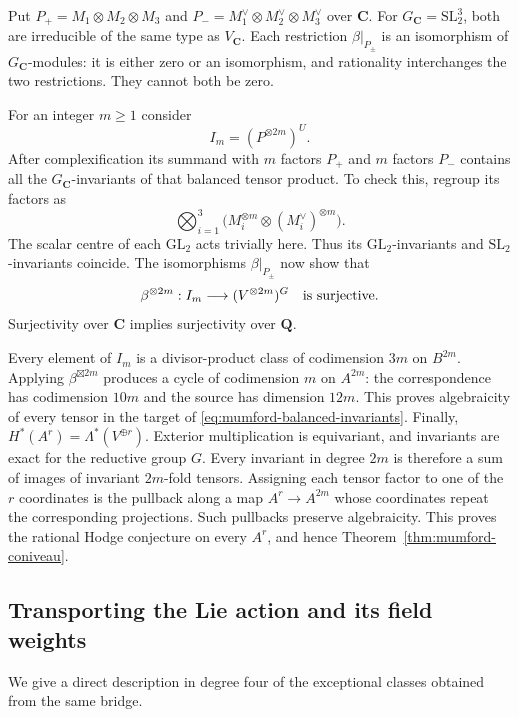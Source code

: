 \documentclass[11pt]{article}
\theoremstyle{definition}
\theoremstyle{remark}
\begin{document}
Put $P_+=M_1\otimes M_2\otimes M_3$ and
$P_-=M_1^\vee\otimes M_2^\vee\otimes M_3^\vee$ over $\mathbf C$.
For $G_{\mathbf C}=\mathrm{SL}_2^3$, both are irreducible of the
same type as $V_{\mathbf C}$.  Each restriction $\beta|_{P_\pm}$
is an isomorphism of $G_{\mathbf C}$-modules: it is either zero or
an isomorphism, and rationality interchanges the two restrictions.
They cannot both be zero.

For an integer $m\geq1$ consider
\[
 I_m=(P^{\otimes 2m})^U.
\]
After complexification its summand with $m$ factors $P_+$ and $m$
factors $P_-$ contains all the $G_{\mathbf C}$-invariants of that
balanced tensor product.  To check this, regroup its factors as
\[
 \bigotimes_{i=1}^3
       \bigl(M_i^{\otimes m}\otimes(M_i^\vee)^{\otimes m}\bigr).
\]
The scalar centre of each $\mathrm{GL}_2$ acts trivially here.
Thus its $\mathrm{GL}_2$-invariants and
$\mathrm{SL}_2$-invariants coincide.
The isomorphisms $\beta|_{P_\pm}$ now show that
\begin{equation}
 \beta^{\otimes2m}:I_m\longrightarrow(V^{\otimes2m})^G
       \quad\hbox{is surjective}.
 \label{eq:mumford-balanced-invariants}
\end{equation}
Surjectivity over $\mathbf C$ implies surjectivity over $\mathbf Q$.

Every element of $I_m$ is a divisor-product class of codimension $3m$
on $B^{2m}$.  Applying $\beta^{\boxtimes2m}$ produces a cycle of
codimension $m$ on $A^{2m}$: the correspondence has codimension $10m$
and the source has dimension $12m$.  This proves algebraicity of
every tensor in the target of \eqref{eq:mumford-balanced-invariants}.
Finally, $H^*(A^r)=\Lambda^*(V^{\oplus r})$.  Exterior multiplication
is equivariant, and invariants are exact for the reductive group $G$.
Every invariant in degree $2m$ is therefore a sum of images of
invariant $2m$-fold tensors.  Assigning each tensor factor to one of
the $r$ coordinates is the pullback along a map
$A^r\to A^{2m}$ whose coordinates repeat the corresponding
projections.  Such pullbacks preserve algebraicity.
This proves the rational Hodge conjecture on every $A^r$, and hence
Theorem~\ref{thm:mumford-coniveau}.

\subsection{Transporting the Lie action and its field weights}

We give a direct description in degree four of the exceptional classes
obtained from the same bridge.
\end{document}
